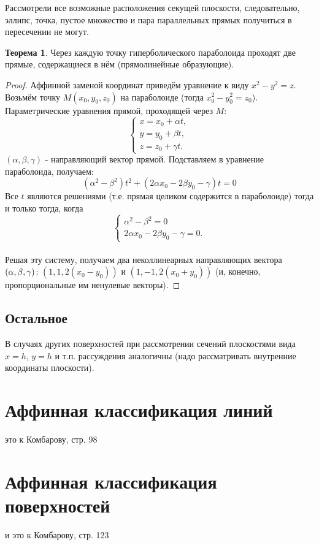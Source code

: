 \documentclass[a4paper, 12pt]{article}
\theoremstyle{definition}
\newtheorem*{theorem}{Теорема}
\begin{document}
Рассмотрели все возможные расположения секущей плоскости, следовательно, эллипс, точка, пустое множество и пара параллельных прямых получиться в пересечении не могут.

\begin{theorem}
    Через каждую точку гиперболического параболоида проходят две прямые, содержащиеся в нём (прямолинейные образующие).
\end{theorem}
\begin{proof}
    Аффинной заменой координат приведём уравнение к виду $x^2 - y^2 = z$.
    Возьмём точку $M(x_0, y_0, z_0)$ на параболоиде (тогда $x_0^2 - y_0^2 = z_0$).
    Параметрические уравнения прямой, проходящей через $M$:
    \[\begin{cases}
        x = x_0 + \alpha t, \\
        y = y_0 + \beta t, \\
        z = z_0 + \gamma t.
    \end{cases}\]
    $(\alpha, \beta, \gamma)$ - направляющий вектор прямой.
    Подставляем в уравнение параболоида, получаем:
    $$(\alpha^2 - \beta^2)t^2 + (2 \alpha x_0 - 2 \beta y_0 - \gamma)t = 0$$
    Все $t$ являются решениями (т.е. прямая целиком содержится в параболоиде) тогда и только тогда, когда
    $$\begin{cases}
        \alpha^2 - \beta^2 = 0 \\
        2 \alpha x_0 - 2 \beta y_0 - \gamma = 0.
    \end{cases}$$\\
    Решая эту систему, получаем два неколлинеарных направляющих вектора $\\(\alpha, \beta, \gamma)$: $(1, 1, 2(x_0 - y_0))$ и $(1, -1, 2(x_0 + y_0))$ (и, конечно, пропорциональные им ненулевые векторы).
\end{proof}


\subsection{Остальное}
В случаях других поверхностей при рассмотрении сечений плоскостями вида $x = h$, $y = h$ и т.п. рассуждения аналогичны (надо рассматривать внутренние координаты плоскости).

\section{Аффинная классификация линий}
это к Комбарову, стр. 98

\section{Аффинная классификация поверхностей}
и это к Комбарову, стр. 123
\end{document}

